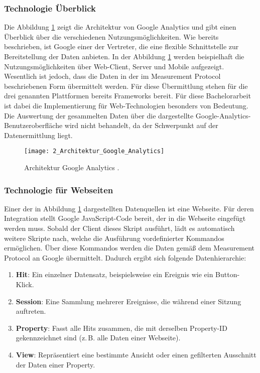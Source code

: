 \subsubsection{Technologie Überblick}
Die Abbildung \ref{fig:googel_analytics_architecture} zeigt die Architektur von Google Analytics und gibt einen Überblick über die verschiedenen Nutzungsmöglichkeiten. Wie bereits beschrieben, ist Google einer der Vertreter, die eine flexible Schnittstelle zur Bereitstellung der Daten anbieten. In der Abbildung \ref{fig:googel_analytics_architecture} werden beispielhaft die Nutzungsmöglichkeiten über Web-Client, Server und Mobile aufgezeigt.
Wesentlich ist jedoch, dass die Daten in der im Measurement Protocol \cite{google_developers_sending_events} beschriebenen Form übermittelt werden. Für diese Übermittlung stehen für die drei genannten Plattformen bereits Frameworks bereit. Für diese Bachelorarbeit ist dabei die Implementierung für Web-Technologien besonders von Bedeutung. Die Auswertung der gesammelten Daten über die dargestellte Google-Analytics-Benutzeroberfläche wird nicht behandelt, da der Schwerpunkt auf der Datenermittlung liegt.

\begin{figure}[h]
\centering
\texttt{[image: 2\_Architektur\_Google\_Analytics]}
\caption{Architektur Google Analytics \cite{google_developers_sending_events}.}
\label{fig:googel_analytics_architecture}
\end{figure}

\subsubsection{Technologie für Webseiten}
Einer der in Abbildung \ref{fig:googel_analytics_architecture} dargestellten Datenquellen ist eine Webseite. Für deren Integration stellt Google JavaScript-Code bereit, der in die Webseite eingefügt werden muss. Sobald der Client dieses Skript ausführt, lädt es automatisch weitere Skripte nach, welche die Ausführung vordefinierter Kommandos ermöglichen. 
Über diese Kommandos werden die Daten gemäß dem Measurement Protocol \cite{google_developers_sending_events} an Google übermittelt. 
Dadurch ergibt sich folgende Datenhierarchie:

\begin{enumerate}
    \item \textbf{Hit}: Ein einzelner Datensatz, beispielsweise ein Ereignis wie ein Button-Klick.
    \item \textbf{Session}: Eine Sammlung mehrerer Ereignisse, die während einer Sitzung auftreten.
    \item \textbf{Property}: Fasst alle Hits zusammen, die mit derselben Property-ID gekennzeichnet sind (z.\,B. alle Daten einer Webseite).
    \item \textbf{View}: Repräsentiert eine bestimmte Ansicht oder einen gefilterten Ausschnitt der Daten einer Property.
\end{enumerate}

